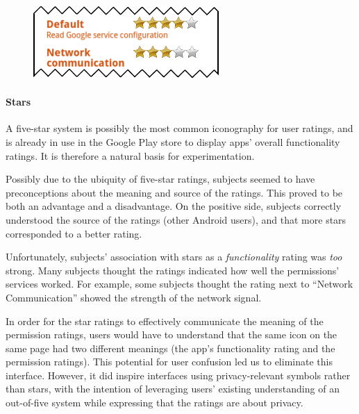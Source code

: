 \documentclass[11pt]{article}
\begin{document}
\label{ss-sec-stars-r1}
\begin{figure}
\begin{center}
\includegraphics[width=.9\linewidth]{candidate-img/stars/starsR1.png}
\end{center}
\end{figure}

\paragraph{Stars}
\label{s-sec-stars}

A five-star system is possibly the most common iconography for user ratings,
and is already in use in the Google Play store to display apps' overall 
functionality ratings. It is therefore a natural basis for experimentation.



Possibly due to the ubiquity of five-star ratings, 
subjects seemed to have preconceptions 
about the meaning and source of the ratings. This proved to be both an 
advantage and a disadvantage. On the positive side, 
subjects correctly understood the source of
the ratings (other Android users), and that more stars corresponded to a 
better rating.

Unfortunately, subjects' association with stars as a \emph{functionality} rating 
was \emph{too} strong. Many subjects thought the ratings indicated how well 
the permissions' services worked. For example, some subjects thought the rating next 
to ``Network Communication'' showed the strength of the network signal. 

In order for the star ratings to effectively communicate the meaning of the permission 
ratings, users would have to understand that the same icon
on the same page had two different meanings (the app's functionality
rating and the permission ratings). This potential for user confusion led
us to eliminate this interface.
However, it did inspire interfaces using privacy-relevant symbols rather than stars, with 
the intention of
leveraging users' existing understanding of an out-of-five system while
expressing that the ratings are about privacy.
\end{document}
